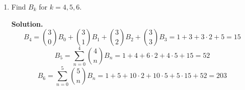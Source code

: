 \documentclass{book}
\begin{document}
\begin{activity}[]
\begin{enumerate}[font=\bfseries,label=(\alph*),ref=\alph*]
\item\label{task-218} \hypertarget{p-1132}{}%
Find \(B_k\) for \(k=4,5,6\).%
\par\smallskip%
\noindent\textbf{Solution.}\hypertarget{solution-97}{}\quad%
\hypertarget{p-1133}{}%
%
\begin{equation*}
B_4 =\binom{3}{0}B_0 +\binom{3}{1}B_1 +\binom{3}{2}B_2 +
\binom{3}{3}B_3=1 +3+3\cdot2 +5=15
\end{equation*}
%
\begin{equation*}
B_5 = \sum_{n=0}^4 \binom{4}{n}B_n = 1 +4+6\cdot2 +4\cdot5 + 15=52
\end{equation*}
%
\begin{equation*}
B_6 = \sum_{n=0}^5 \binom{5}{n}B_n =1+5 +10\cdot2 +10\cdot 5
+5\cdot 15 +52=203
\end{equation*}
%
\end{enumerate}
\end{activity}

\clearpage
\end{document}
